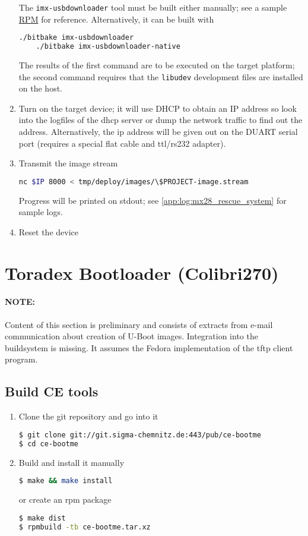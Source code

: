 \begin{enumerate}
  The \texttt{imx-usbdownloader} tool must be built either manually;
  see a sample
  \href{http://www.sigma-chemnitz.de/elito/sources/imx-usbdownloader-0.0.2-1.fc17x.src.rpm}{RPM}
  for reference.  Alternatively, it can be built with
  \begin{lstlisting}[language=sh]
    ./bitbake imx-usbdownloader
    ./bitbake imx-usbdownloader-native
  \end{lstlisting}
  The results of the first command are to be executed on the target
  platform; the second command requires that the \texttt{libudev}
  development files are installed on the host.
\item Turn on the target device; it will use DHCP to obtain an IP
  address so look into the logfiles of the dhcp server or dump the
  network traffic to find out the address.  Alternatively, the ip
  address will be given out on the DUART serial port (requires a
  special flat cable and ttl/rs232 adapter).
\item Transmit the image stream
  \begin{lstlisting}[language=sh]
    nc $IP 8000 < tmp/deploy/images/\$PROJECT-image.stream
  \end{lstlisting}
  Progress will be printed on stdout; see
  \ref{app:log:mx28_rescue_system} for sample logs.
\item Reset the device
\end{enumerate}


\section{Toradex Bootloader (Colibri270)}

\paragraph{NOTE:} Content of this section is preliminary and consists
of extracts from e-mail communication about creation of U-Boot images.
Integration into the buildsystem is missing.  It assumes the Fedora
implementation of the tftp client program.

\subsection{Build CE tools}
\label{subsec:toradex_cetools}

\begin{enumerate}
\item Clone the git repository and go into it
\begin{lstlisting}[language=sh]
$ git clone git://git.sigma-chemnitz.de:443/pub/ce-bootme
$ cd ce-bootme
\end{lstlisting}
\item Build and install it manually
\begin{lstlisting}[language=sh]
$ make && make install
\end{lstlisting}%
or create an rpm package
\begin{lstlisting}[language=sh]
$ make dist
$ rpmbuild -tb ce-bootme.tar.xz
\end{lstlisting}
\end{enumerate}

